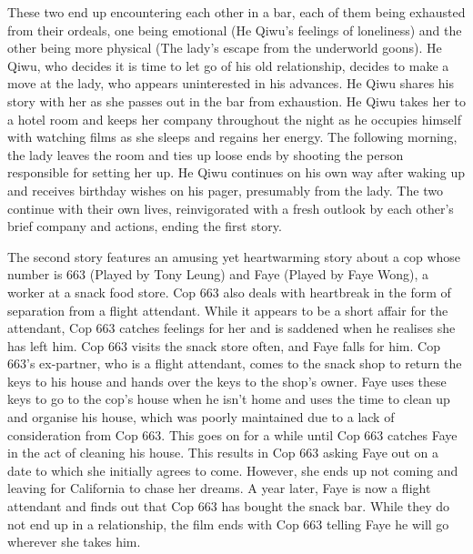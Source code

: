 \begin{multicols}{2}
These two end up encountering each other in a bar, each of them being exhausted from their ordeals, one being emotional (He Qiwu’s feelings of loneliness) and the other being more physical (The lady’s escape from the underworld goons). He Qiwu, who decides it is time to let go of his old relationship, decides to make a move at the lady, who appears uninterested in his advances. He Qiwu shares his story with her as she passes out in the bar from exhaustion. He Qiwu takes her to a hotel room and keeps her company throughout the night as he occupies himself with watching films as she sleeps and regains her energy. The following morning, the lady leaves the room and ties up loose ends by shooting the person responsible for setting her up. He Qiwu continues on his own way after waking up and receives birthday wishes on his pager, presumably from the lady. The two continue with their own lives, reinvigorated with a fresh outlook by each other's brief company and actions, ending the first story.

The second story features an amusing yet heartwarming story about a cop whose number is 663 (Played by Tony Leung) and Faye (Played by Faye Wong), a worker at a snack food store. Cop 663 also deals with heartbreak in the form of separation from a flight attendant. While it appears to be a short affair for the attendant, Cop 663 catches feelings for her and is saddened when he realises she has left him. Cop 663 visits the snack store often, and Faye falls for him. Cop 663’s ex-partner, who is a flight attendant, comes to the snack shop to return the keys to his house and hands over the keys to the shop's owner. Faye uses these keys to go to the cop's house when he isn't home and uses the time to clean up and organise his house, which was poorly maintained due to a lack of consideration from Cop 663. This goes on for a while until Cop 663 catches Faye in the act of cleaning his house. This results in Cop 663 asking Faye out on a date to which she initially agrees to come. However, she ends up not coming and leaving for California to chase her dreams. A year later, Faye is now a flight attendant and finds out that Cop 663 has bought the snack bar. While they do not end up in a relationship, the film ends with Cop 663 telling Faye he will go wherever she takes him.


\end{multicols}
